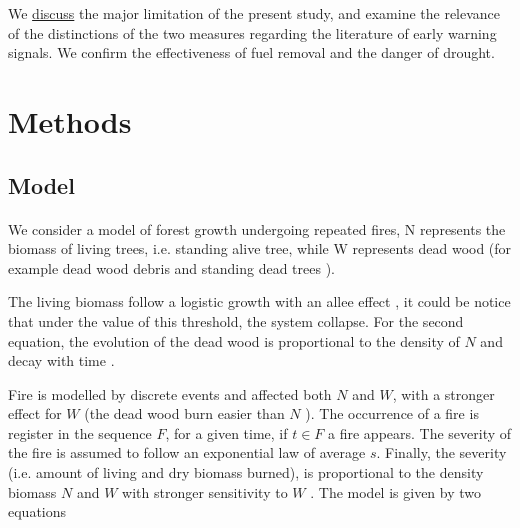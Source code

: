 \documentclass{article}
\begin{document}
We \hyperref[Discussion]{discuss} the major limitation of the present study, and examine the relevance of the distinctions of the two measures regarding the literature of early warning signals. We confirm the effectiveness of fuel removal and the danger of drought.








\newpage
\section{Methods}


\subsection{Model}

\label{dynamical_system}
\label{fuel}
\paragraph{}
We consider a model of forest growth undergoing repeated fires, N represents the biomass of living trees, i.e. standing alive tree, while W represents dead wood (for example dead wood debris and standing dead trees \citep{russell2015quantifying}). 

The living biomass follow a logistic growth \citep{tsoularis2002analysis, jensen1975comparison} with an allee effect \citep{stephens1999allee, amarasekare1998allee}, it could be notice that under the value of this threshold, the system collapse. For the second equation, the evolution of the dead wood is proportional to the density of $N$ and decay with time \citep{kahl_wood_2017, shorohova_stump_2012, christensen_estimation_1977, delaney_quantity_1998}.%

Fire is modelled by discrete events and affected both $N$ and $W$, with a stronger effect for $W$ (the dead wood burn easier than $N$ \citep{brown1985predicting}). The occurrence of a fire is register in the sequence $F$, for a given time, if $t\in F$ a fire appears. The severity of the fire is assumed to follow an exponential law of average $s$. Finally, the severity (i.e. amount of living and dry biomass burned), is proportional to the density biomass $N$ and $W$ with stronger sensitivity to $W$ \citep{martinson_fuel_2013, safford_effects_2009, lecomte_effects_2006}. The model is given by two equations
\end{document}
